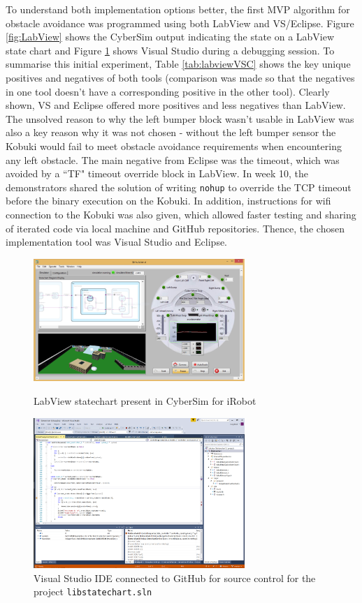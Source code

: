 To understand both implementation options better, the first MVP algorithm for obstacle avoidance was programmed using both LabView and VS/Eclipse. Figure \ref{fig:LabView} shows the CyberSim output indicating the state on a LabView state chart and Figure \ref{fig:VS} shows Visual Studio during a debugging session. To summarise this initial experiment, Table \ref{tab:labviewVSC} shows the key unique positives and negatives of both tools (comparison was made so that the negatives in one tool doesn't have a corresponding positive in the other tool). Clearly shown, VS and Eclipse offered more positives and less negatives than LabView. The unsolved reason to why the left bumper block wasn't usable in LabView was also a key reason why it was not chosen - without the left bumper sensor the Kobuki would fail to meet obstacle avoidance requirements when encountering any left obstacle. The main negative from Eclipse was the timeout, which was avoided by a ``TF" timeout override block in LabView. In week 10, the demonstrators shared the solution of writing \texttt{nohup} to override the TCP timeout before the binary execution on the Kobuki. In addition, instructions for wifi connection to the Kobuki was also given, which allowed faster testing and sharing of iterated code via local machine and GitHub repositories. Thence, the chosen implementation tool was Visual Studio and Eclipse.
\begin{figure}[H]
    \centering
    \begin{minipage}{0.45\textwidth}
    \centering
    \includegraphics[width=8cm]{Images/LabViewStateChart.png}
    \caption{LabView statechart present in CyberSim for iRobot \cite[p.~32]{labguide}}
    \label{fig:LabView}
    \end{minipage} \hspace{0.5cm}%
    \begin{minipage}{0.45\textwidth}
    \centering
    \includegraphics[width=8cm]{Images/VisualStudio.png}
    \caption{Visual Studio IDE connected to GitHub for source control for the project \texttt{libstatechart.sln}}
    \label{fig:VS}
    \end{minipage}
\end{figure}

